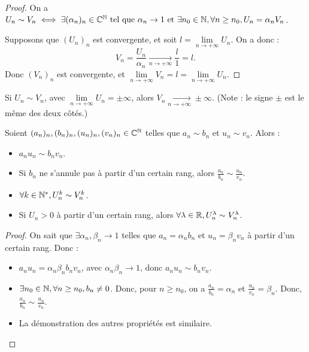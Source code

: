 \documentclass[12pt, a4paper]{report}
\begin{document}
\begin{proof}
    On a $U_n \sim V_n \iff \exists (\alpha_n)_n \in \mathbb{C}^{\mathbb{N}} \text{ tel que } \alpha_n \to 1 \text{ et } \exists n_0 \in \mathbb{N}, \forall n \ge n_0, U_n = \alpha_n V_n$.

    Supposons que $(U_n)_n$ est convergente, et soit $l = \lim\limits_{n\to+\infty} U_n$. On a donc :
    \[V_n = \frac{U_n}{\alpha_n} \xrightarrow[n\to+\infty]{} \frac{l}{1} = l.\]
    Donc $(V_n)_n$ est convergente, et $\lim\limits_{n\to+\infty} V_n = l = \lim\limits_{n\to+\infty} U_n$.
\end{proof}

\begin{property}
    Si $U_n \sim V_n$, avec $\lim\limits_{n\to+\infty} U_n = \pm\infty$, alors $V_n \xrightarrow[n\to+\infty]{} \pm\infty$. (Note : le signe $\pm$ est le même des deux côtés.)
\end{property}

\begin{property}
    Soient $(a_n)_n, (b_n)_n, (u_n)_n, (v_n)_n \in \mathbb{C}^{\mathbb{N}}$ telles que $a_n \sim b_n$ et $u_n \sim v_n$. Alors :
    \begin{itemize}
        \item $a_n u_n \sim b_n v_n$.
        \item Si $b_n$ ne s'annule pas à partir d'un certain rang, alors $\frac{a_n}{b_n} \sim \frac{u_n}{v_n}$.
        \item $\forall k \in \mathbb{N}^*, U_n^k \sim V_n^k$.
        \item Si $U_n>0$ à partir d'un certain rang, alors $\forall \lambda \in \mathbb{R}, U_n^\lambda \sim V_n^\lambda$.
    \end{itemize}
\end{property}

\begin{proof}
    On sait que $\exists \alpha_n, \beta_n \to 1$ telles que $a_n = \alpha_n b_n$ et $u_n = \beta_n v_n$ à partir d'un certain rang. Donc :
    \begin{itemize}
        \item $a_n u_n = \alpha_n \beta_n b_n v_n$, avec $\alpha_n \beta_n \to 1$, donc $a_n u_n \sim b_n v_n$.
        \item $\exists n_0 \in \mathbb{N}, \forall n \ge n_0, b_n \ne 0$. Donc, pour $n \ge n_0$, on a $\frac{a_n}{b_n} = \alpha_n$ et $\frac{u_n}{v_n} = \beta_n$. Donc, $\frac{a_n}{b_n} \sim \frac{u_n}{v_n}$.
        \item La démonstration des autres propriétés est similaire.
    \end{itemize}
\end{proof}
\end{document}
